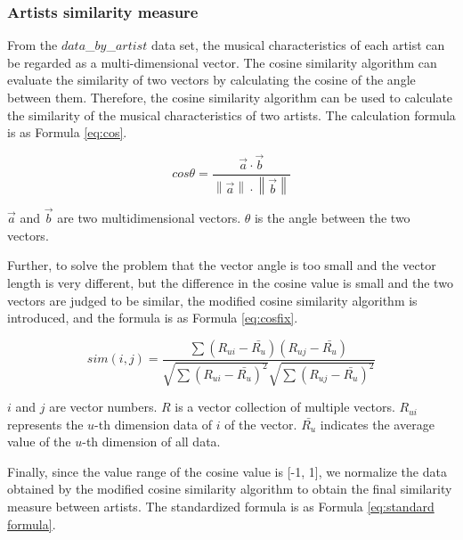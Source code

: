 \documentclass[12pt]{article}  %
\begin{document}
 
 
\subsubsection{Artists similarity measure}

From the $data$\_$by$\_$artist$ data set, the musical characteristics of each artist can be regarded as a multi-dimensional vector. The cosine similarity algorithm can evaluate the similarity of two vectors by calculating the cosine of the angle between them. Therefore, the cosine similarity algorithm can be used to calculate the similarity of the musical characteristics of two artists. The calculation formula is as Formula \ref{eq:cos}. 

\begin{equation}\label{eq:cos}
    cos\theta = \frac{\vec{a}\cdot \vec{b}}{\left \| \vec{a} \right \|\cdot \left \| \vec{b} \right \|}
\end{equation}

$\vec{a}$ and $\vec{b}$ are two multidimensional vectors. $\theta$ is the angle between the two vectors. 

Further, to solve the problem that the vector angle is too small and the vector length is very different, but the difference in the cosine value is small and the two vectors are judged to be similar, the modified cosine similarity algorithm is introduced, and the formula is as Formula \ref{eq:cosfix}.

\begin{equation}\label{eq:cosfix}
    sim\left (  i,j\right )=\frac{\sum \left ( R_{ui} - \bar{R_u}\right ) \left ( R_{uj} - \bar{R_u}\right )}{\sqrt{\sum \left ( R_{ui} - \bar{R_u}\right )^{2}}\sqrt{\sum \left ( R_{uj} - \bar{R_u}\right )^{2}}}
\end{equation}

$i$ and $j$ are vector numbers. $R$ is a vector collection of multiple vectors. $R_{ui}$ represents the $u$-th dimension data of $i$ of the vector. $\bar{R_u}$ indicates the average value of the $u$-th dimension of all data.\par
Finally, since the value range of the cosine value is [-1, 1], we normalize the data obtained by the modified cosine similarity algorithm to obtain the final similarity measure between artists. The standardized formula is as Formula \ref{eq:standard formula}.
\end{document}
